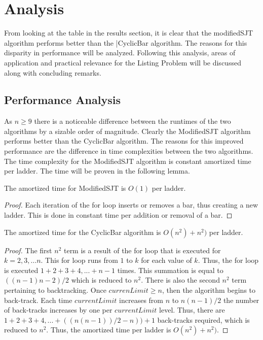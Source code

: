 
\section{Analysis}
From looking at the table in the results section, it is clear that the {\sc modifiedSJT} algorithm performs 
better than the  |{\sc CyclicBar} algorithm. The reasons for this disparity in performance 
will be analyzed. Following this analysis, areas of application and practical relevance for the Listing Problem 
will be discussed along with concluding remarks.

\subsection{Performance Analysis}
    As $n \geq 9$ there is a noticeable difference between the runtimes of the two algorithms by a sizable order 
    of magnitude. Clearly the {\sc ModifiedSJT} algorithm performs better than the {\sc CyclicBar} algorithm. The reasons 
    for this improved performance are the difference in time complexities between the two algorithms.
    The time complexity for the {\sc ModifiedSJT} algorithm is constant amortized time per ladder. The time will be proven in the following lemma.
    \begin{lemma}
        The amortized time for {\sc ModifiedSJT} is $O(1)$ per ladder.
    \end{lemma}
    \begin{proof}
        Each iteration of the for loop inserts or removes a bar, thus creating a new ladder. This is done in constant time 
        per addition or removal of a bar. 
    \end{proof}
    \begin{lemma}
       The amortized time for the  {\sc CyclicBar} algorithm is $O(n^{2}) + n^{2})$ per ladder.
    \end{lemma}
    \begin{proof}
        The first $n^{2}$ term is a result of the for loop that is executed for $k=2,3, \dots n$. This for loop runs 
        from $1$ to $k$ for each value of $k$. Thus, the for loop is executed $1 + 2 + 3 + 4, ... + n-1$ times. This summation 
        is equal to $((n-1)n-2)/2$ which is reduced to $n^{2}$. There is also the second $n^{2}$ term pertaining to backtracking. 
        Once $currenLimit \geq n$, then the algorithm 
        begins to back-track. Each time $currentLimit$ increases from $n$ to $n(n-1)/2$ the number of back-tracks increases by one per 
        $currentLimit$ level.
       Thus, there are $1 + 2 + 3 + 4, ... +  ((n(n-1))/2 - n)) + 1$ back-tracks required, which is reduced to $n^{2}$. Thus, the amortized  
       time per ladder is $O(n^{2}) + n^{2})$.
    \end{proof}

